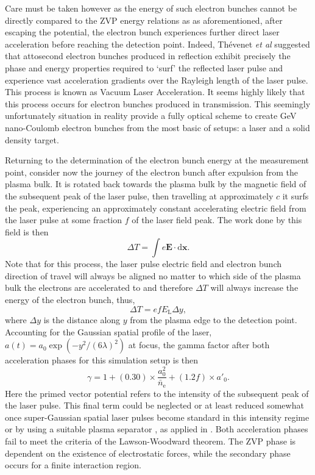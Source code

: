 Care must be taken however as the energy of such electron bunches cannot be directly compared to the ZVP energy relations as as aforementioned, after escaping the potential, the electron bunch experiences further direct laser acceleration before reaching the detection point. Indeed, Thévenet \textit{et al} \cite{thevenetVacuumLaserAcceleration2016} suggested that attosecond electron bunches produced in reflection exhibit precisely the phase and energy properties required to `surf' the reflected laser pulse and experience vast acceleration gradients over the Rayleigh length of the laser pulse. This process is known as Vacuum Laser Acceleration. It seems highly likely that this process occurs for electron bunches produced in transmission. This seemingly unfortunately situation in reality provide a fully optical scheme to create GeV nano-Coulomb electron bunches from the most basic of setups: a laser and a solid density target.

Returning to the determination of the electron bunch energy at the measurement point, consider now the journey of the electron bunch after expulsion from the plasma bulk. It is rotated back towards the plasma bulk by the magnetic field of the subsequent peak of the laser pulse, then travelling at approximately $c$ it surfs the peak, experiencing an approximately constant accelerating electric field from the laser pulse at some fraction $f$ of the laser field peak. The work done by this field is then
\begin{equation}
	\Delta T = \int e \mathbf{E} \cdot \mathrm{d}\mathbf{x}.
\end{equation}
Note that for this process, the laser pulse electric field and electron bunch direction of travel will always be aligned no matter to which side of the plasma bulk the electrons are accelerated to and therefore $\Delta T$ will always increase the energy of the electron bunch, thus,
\begin{equation}
	\Delta T = e f E_\mathrm{L} \Delta y,
\end{equation}
where $\Delta y$ is the distance along $y$ from the plasma edge to the detection point. Accounting for the Gaussian spatial profile of the laser, $a(t) = a_0 \exp(-y^2/(6\lambda)^2)$ at focus, the gamma factor after both acceleration phases for this simulation setup is then
\begin{equation}\label{eq:zvp-gamma}
	\gamma = 1 + (0.30)\times \frac{a^2_0}{\bar{n}_\mathrm{e}} + (1.2f)\times a'_0.
\end{equation}
Here the primed vector potential refers to the intensity of the subsequent peak of the laser pulse. This final term could be neglected or at least reduced somewhat once super-Gaussian spatial laser pulses become standard in this intensity regime or by using a suitable plasma separator \cite{miyauchiLaserElectronAcceleration2004}, as applied in \cite{andreevDoubleRelativisticElectron2013}. Both acceleration phases fail to meet the criteria of the Lawson-Woodward theorem. The ZVP phase is dependent on the existence of electrostatic forces, while the secondary phase occurs for a finite interaction region.

